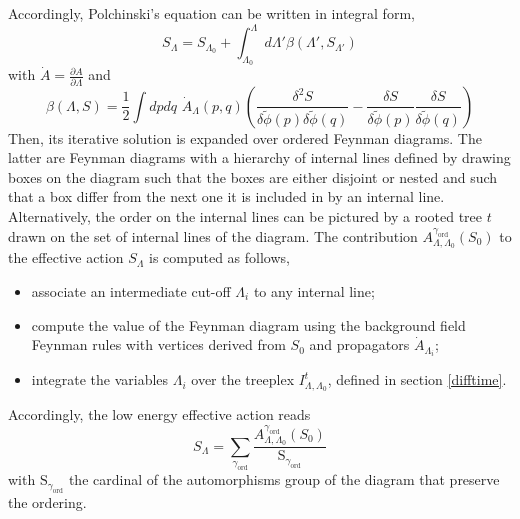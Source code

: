 \documentclass[10pt,here,feynmf]{article}
\begin{document}
Accordingly, Polchinski's equation can be written in integral form,
\begin{equation}
S_{\Lambda}=S_{\Lambda_{0}}+\int_{\Lambda_{0}}^{\Lambda}d\Lambda'
\beta(\Lambda',S_{\Lambda'})
\end{equation}
with $\dot{A}=\frac{\partial A}{\partial \Lambda}$ and
\begin{equation}
\beta(\Lambda,S)
=\frac{1}{2}
\int\!dpdq\,\,  \dot{A}_{\Lambda}(p,q)
\left(
\frac{\delta^{2}S}{\delta\widetilde{\phi}(p)\delta\widetilde{\phi}(q)}
- \frac{\delta S}{\delta\widetilde{\phi}(p)} \frac{\delta S}{\delta\widetilde{\phi}(q)} \right)
\end{equation}
Then, its iterative solution is expanded over ordered Feynman diagrams. The latter are Feynman diagrams with a hierarchy of internal lines defined by drawing boxes on the diagram such that the boxes are either disjoint or nested and such that a box differ from the next one it is included in by an internal line. Alternatively, the order on the internal lines can be pictured by a rooted tree $t$ drawn on the set of internal lines of the diagram. The contribution $A_{\Lambda,\Lambda_{0}}^{\gamma_{\mathrm{ord}}}(S_{0})$ to the effective action $S_{\Lambda}$ is computed as follows,
\begin{itemize}
\item
associate an intermediate cut-off $\Lambda_{i}$ to any internal line;
\item
compute the value of the Feynman diagram using the background field Feynman rules with vertices derived from $S_{0}$ and propagators $\dot{A}_{\Lambda_{i}}$;
\item
integrate the variables $\Lambda_{i}$ over the treeplex $I_{\Lambda,\Lambda_{0}}^{t}$, defined in section \ref{difftime}.
\end{itemize}
Accordingly, the low energy effective action reads
\begin{equation}
S_{\Lambda}=\sum_{\gamma_{\mathrm{ord}}}\frac{A_{\Lambda,\Lambda_{0}}^{\gamma_{\mathrm{ord}}}(S_{0})}{\mathrm{S}_{\gamma_{\mathrm{ord}}}}
\end{equation}
with $\mathrm{S}_{\gamma_{\mathrm{ord}}}$ the cardinal of the automorphisms  group of the diagram that preserve the ordering.
\end{document}
